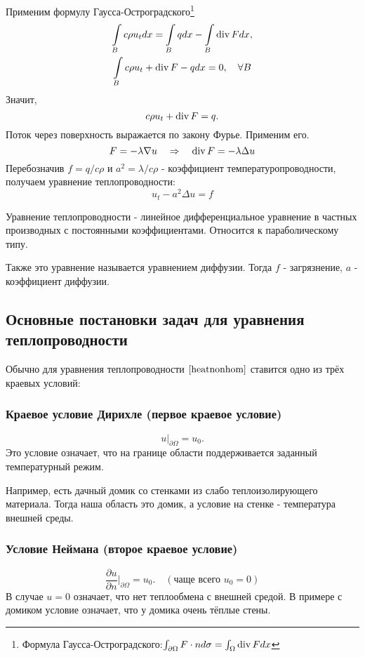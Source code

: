 Применим формулу Гаусса-Остроградского\footnote{Формула Гаусса-Остроградского:$
    \int_{\partial \Omega} F \cdot n d\sigma = \int_{\Omega} \operatorname{div} F dx$}
\begin{gather*}
    \int \limits_B c \rho u_t dx = \int \limits_B q dx - \int \limits_B \operatorname{div} F dx, \\
    \int \limits_B c \rho u_t + \operatorname{div} F - q dx = 0,\quad \forall B
\end{gather*}
Значит,
$$ c \rho u_t + \operatorname{div} F = q.$$
Поток через поверхность выражается по закону Фурье. Применим его.
$$ F = - \lambda \nabla u \quad \Rightarrow \quad \operatorname{div} F = - \lambda \Delta u$$
Перебозначив $f = q/c\rho$ и $ a^2 = \lambda / c \rho $ - коэффициент температуропроводности, получаем уравнение теплопроводности:
\begin{equation}
	u_t - a^2 \Delta u = f
\label{heatnonhom}
\end{equation}

Уравнение теплопроводности - линейное дифференциальное уравнение в частных производных с постоянными коэффициентами. Относится к параболическому типу.

Также это уравнение называется уравнением диффузии. Тогда $f$ - загрязнение, $a$ - коэффициент диффузии.

\subsection{Основные постановки задач для уравнения теплопроводности}
Обычно для уравнения теплопроводности $\eqref{heatnonhom}$ ставится одно из трёх краевых условий:

\subsubsection{Краевое условие Дирихле (первое краевое условие)}
$$u \Bigg \rvert_{\partial\Omega} = u_0.$$
Это условие означает, что на границе области поддерживается заданный температурный режим.

Например, есть дачный домик со стенками из слабо теплоизолирующего материала. Тогда наша область это домик, а условие на стенке - температура внешней среды.

\subsubsection{Условие Неймана (второе краевое условие)}
$$\dfrac{\partial u}{\partial n}\Bigg\rvert_{\partial\Omega} = u_0.\quad (\text{чаще всего }u_0 = 0)$$
В случае $u = 0$ означает, что нет теплообмена с внешней средой. В примере с домиком условие означает, что у домика очень тёплые стены.

